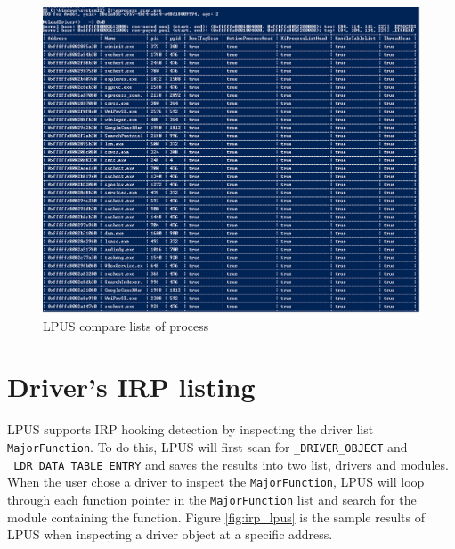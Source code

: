 \begin{figure}[h]
  \centering
  \caption{LPUS compare lists of process}
  \label{fig:psxview}
  \includegraphics[scale=0.7]{images/psxview.png}
\end{figure}

\section[Driver's IRP listing]{Driver's IRP listing}

LPUS supports IRP hooking detection by inspecting the driver list
\texttt{MajorFunction}. To do this, LPUS will first scan for
\texttt{\_DRIVER\_OBJECT} and \texttt{\_LDR\_DATA\_TABLE\_ENTRY} and saves the
results into two list, drivers and modules. When the user chose a driver to
inspect the \texttt{MajorFunction}, LPUS will loop through each function
pointer in the \texttt{MajorFunction} list and search for the module containing
the function. Figure \ref{fig:irp_lpus} is the sample results of LPUS when
inspecting a driver object at a specific address.

